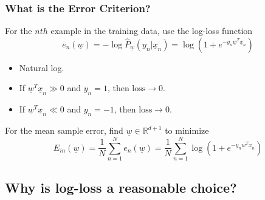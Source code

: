     \subsubsection{What is the Error Criterion?}
    \begin{definition}
        For the $nth$ example in the training data, use the log-loss function
        \begin{equation}
            e_n(\underline{w}) = -\log \hat{P}_{\underline{w}}(y_n | \underline{x}_n) = \log \left(1 + e^{-y_n \underline{w}^T \underline{x}_n}\right)
        \end{equation}
        \begin{itemize}
            \item Natural log. 
            \item If \( \underline{w}^T \underline{x}_n \gg 0 \) and \( y_n = 1 \), then \( \text{loss} \rightarrow 0 \).
            \item If \( \underline{w}^T \underline{x}_n \ll 0 \) and \( y_n = -1 \), then \( \text{loss} \rightarrow 0 \).
        \end{itemize}
        \vspace{1em}

        For the mean sample error, find $\underline{w} \in \mathbb{R}^{d+1}$ to minimize
        \begin{equation}
            E_{in}(\underline{w}) = \frac{1}{N} \sum_{n=1}^{N} e_n(\underline{w}) = \frac{1}{N} \sum_{n=1}^{N} \log \left( 1 + e^{-y_n \underline{w}^T \underline{x}_n} \right)
        \end{equation}
    \end{definition}

\subsection{Why is log-loss a reasonable choice?}

